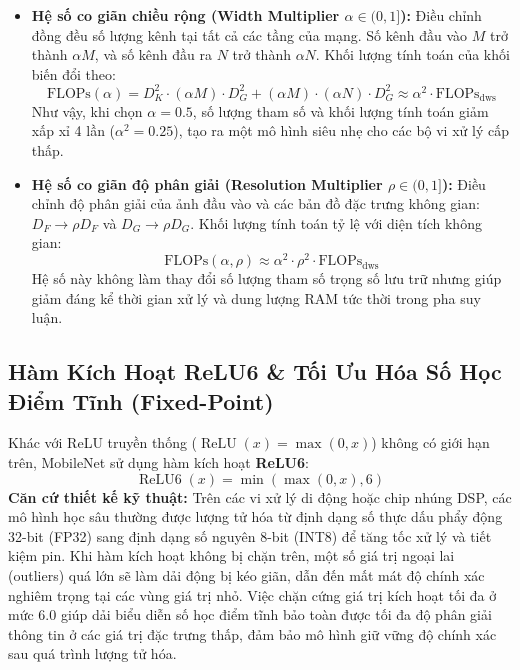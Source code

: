 \documentclass[12pt,a4paper]{report}
\begin{document}
\begin{itemize}[leftmargin=*]
    \item \textbf{Hệ số co giãn chiều rộng (Width Multiplier $\alpha \in (0, 1]$):}
    Điều chỉnh đồng đều số lượng kênh tại tất cả các tầng của mạng. Số kênh đầu vào $M$ trở thành $\alpha M$, và số kênh đầu ra $N$ trở thành $\alpha N$. Khối lượng tính toán của khối biến đổi theo:
    \begin{equation}
        \text{FLOPs}(\alpha) = D_K^2 \cdot (\alpha M) \cdot D_G^2 + (\alpha M) \cdot (\alpha N) \cdot D_G^2 \approx \alpha^2 \cdot \text{FLOPs}_{\text{dws}}
    \end{equation}
    Như vậy, khi chọn $\alpha = 0.5$, số lượng tham số và khối lượng tính toán giảm xấp xỉ 4 lần ($\alpha^2 = 0.25$), tạo ra một mô hình siêu nhẹ cho các bộ vi xử lý cấp thấp.

    \item \textbf{Hệ số co giãn độ phân giải (Resolution Multiplier $\rho \in (0, 1]$):}
    Điều chỉnh độ phân giải của ảnh đầu vào và các bản đồ đặc trưng không gian: $D_F \to \rho D_F$ và $D_G \to \rho D_G$. Khối lượng tính toán tỷ lệ với diện tích không gian:
    \begin{equation}
        \text{FLOPs}(\alpha, \rho) \approx \alpha^2 \cdot \rho^2 \cdot \text{FLOPs}_{\text{dws}}
    \end{equation}
    Hệ số này không làm thay đổi số lượng tham số trọng số lưu trữ nhưng giúp giảm đáng kể thời gian xử lý và dung lượng RAM tức thời trong pha suy luận.
\end{itemize}

\subsection{Hàm Kích Hoạt ReLU6 \& Tối Ưu Hóa Số Học Điểm Tĩnh (Fixed-Point)}
Khác với ReLU truyền thống ($\operatorname{ReLU}(x) = \max(0, x)$) không có giới hạn trên, MobileNet sử dụng hàm kích hoạt \textbf{ReLU6}:
\begin{equation}
    \operatorname{ReLU6}(x) = \min(\max(0, x), 6)
\end{equation}
\textbf{Căn cứ thiết kế kỹ thuật:}
Trên các vi xử lý di động hoặc chip nhúng DSP, các mô hình học sâu thường được lượng tử hóa từ định dạng số thực dấu phẩy động 32-bit (FP32) sang định dạng số nguyên 8-bit (INT8) để tăng tốc xử lý và tiết kiệm pin. Khi hàm kích hoạt không bị chặn trên, một số giá trị ngoại lai (outliers) quá lớn sẽ làm dải động bị kéo giãn, dẫn đến mất mát độ chính xác nghiêm trọng tại các vùng giá trị nhỏ. Việc chặn cứng giá trị kích hoạt tối đa ở mức 6.0 giúp dải biểu diễn số học điểm tĩnh bảo toàn được tối đa độ phân giải thông tin ở các giá trị đặc trưng thấp, đảm bảo mô hình giữ vững độ chính xác sau quá trình lượng tử hóa.
\end{document}
